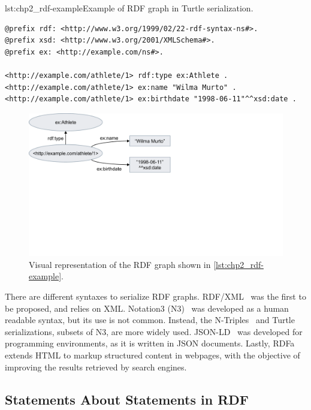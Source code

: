 \begin{minipage}{\textwidth}
\begin{captionedlisting}{lst:chp2_rdf-example}{Example of RDF graph in Turtle serialization.}
\centering
{\begin{lstlisting}[language=r2rml]
@prefix rdf: <http://www.w3.org/1999/02/22-rdf-syntax-ns#>.
@prefix xsd: <http://www.w3.org/2001/XMLSchema#>.
@prefix ex: <http://example.com/ns#>.

<http://example.com/athlete/1> rdf:type ex:Athlete .
<http://example.com/athlete/1> ex:name "Wilma Murto" .
<http://example.com/athlete/1> ex:birthdate "1998-06-11"^^xsd:date .
\end{lstlisting}}
\end{captionedlisting}
\end{minipage}

\begin{figure}[h]
\centering
\includegraphics[width=0.6\linewidth]{figures/chp2_rdf-example.pdf}
\caption[RDF graph example]{Visual representation of the RDF graph shown in \cref{lst:chp2_rdf-example}.}
\label{fig:chp2_rdf-example}
\end{figure}

There are different syntaxes to serialize RDF graphs. 
RDF/XML~\parencite{rdfxml} was the first to be proposed, and relies on XML. 
Notation3 (N3)~\parencite{notation3} was developed as a human readable syntax, but its use is not common. 
Instead, the N-Triples~\parencite{ntriples} and Turtle~\parencite{turtle} serializations, subsets of N3, are more widely used. 
JSON-LD~\parencite{jsonld} was developed for programming environments, as it is written in JSON documents. 
Lastly, RDFa~\parencite{rdfa} extends HTML to markup structured content in webpages, with the objective of improving the results retrieved by search engines. 



\subsection{Statements About Statements in RDF}
\label{sec:chp2_reifications}

